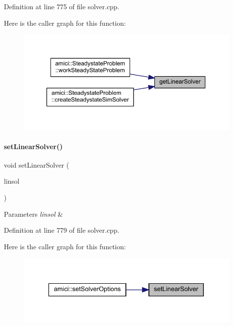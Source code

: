 Definition at line 775 of file solver.\+cpp.

Here is the caller graph for this function\+:
\nopagebreak
\begin{figure}[H]
\begin{center}
\leavevmode
\includegraphics[width=350pt]{classamici_1_1_solver_aa5cde2d316aae1d60d6eaf94ce7a854f_icgraph}
\end{center}
\end{figure}
\mbox{\label{classamici_1_1_solver_acc8ecf11ad5a8480dd02f757faa264b2}} 
\paragraph{\texorpdfstring{setLinearSolver()}{setLinearSolver()}}
{\footnotesize\ttfamily void set\+Linear\+Solver (\begin{DoxyParamCaption}\item[{\mbox{\hyperlink{namespaceamici_a1a6a4776314a0843143e5631c3ce21a7}{Linear\+Solver}}}]{linsol }\end{DoxyParamCaption})}


\begin{DoxyParams}{Parameters}
{\em linsol} & \\
\hline
\end{DoxyParams}


Definition at line 779 of file solver.\+cpp.

Here is the caller graph for this function\+:
\nopagebreak
\begin{figure}[H]
\begin{center}
\leavevmode
\includegraphics[width=323pt]{classamici_1_1_solver_acc8ecf11ad5a8480dd02f757faa264b2_icgraph}
\end{center}
\end{figure}
\mbox{\label{classamici_1_1_solver_a256c45c84346e83402b665493e04e65e}} 
